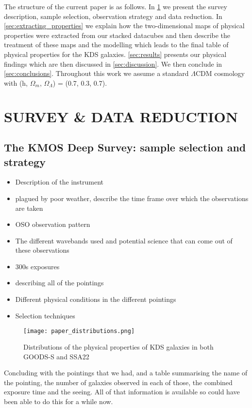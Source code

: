 \documentclass[a4paper,fleqn,usenatbib]{mn2e}
\begin{document}
The structure of the current paper is as follows. In \cref{sec:Survey_and_data} we present the survey description, sample selection, observation strategy and data reduction.
In \cref{sec:extracting_properties} we explain how the two-dimensional maps of physical properties were extracted from our stacked datacubes and then describe the treatment of these maps and the modelling which leads to the final table of physical properties for the KDS galaxies. 
\cref{sec:results} presents our physical findings which are then discussed in \cref{sec:discussion}.
We then conclude in \cref{sec:conclusions}.
Throughout this work we assume a standard $\Lambda$CDM cosmology with (h, $\Omega_{m}$, $\Omega_{\Lambda}$) = (0.7, 0.3, 0.7). 

\section{SURVEY \& DATA REDUCTION}\label{sec:Survey_and_data}

\subsection{The KMOS Deep Survey: sample selection and strategy}




\begin{itemize}
    \item Description of the instrument 
    \item plagued by poor weather, describe the time frame over which the observations are taken
    \item OSO observation pattern
    \item The different wavebands used and potential science that can come out of these observations
    \item 300s exposures
    \item describing all of the pointings 
    \item Different physical conditions in the different pointings
    \item Selection techniques 
\end{itemize}

\begin{figure}
\centering
\texttt{[image: paper\_distributions.png]}
\caption{Distributions of the physical properties of KDS galaxies in both GOODS-S and SSA22}
\label{fig:distributions}
\end{figure}

Concluding with the pointings that we had, and a table summarising the name of the pointing, the number of galaxies observed in each of those, the combined exposure time and the seeing. All of that information is available so could have been able to do this for a while now.
\end{document}
